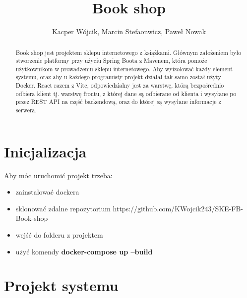 \documentclass[]{article}
\title{Book shop}
\author{Kacper Wójcik, Marcin Stefaonwicz, Paweł Nowak}
\begin{document}
\maketitle

\begin{abstract}
	Book shop jest projektem sklepu internetowego z książkami. Głównym założeniem było stworzenie platformy przy użyciu Spring Boota z Mavenem, która pomoże użytkownikom w prowadzeniu sklepu internetowego. Aby wyizolować każdy element systemu, oraz aby u każdego programisty projekt działał tak samo został użyty Docker. React razem z Vite, odpowiedzialny jest za warstwę, którą bezpośrednio odbiera klient tj. warstwę frontu, z której dane są odbierane od klienta i wysyłane po przez REST API na część backendową, oraz do której są wysyłane informacje z serwera.

\end{abstract}
\section* {Inicjalizacja}
Aby móc uruchomić projekt trzeba:
\begin{itemize}
	\item zainstalować dockera
	\item sklonować zdalne repozytorium https://github.com/KWojcik243/SKE-FB-Book-shop
	\item wejść do folderu z projektem
	\item użyć komendy \textbf{docker-compose up --build}
\end{itemize}

\newpage

\section{Projekt systemu}
\end{document}
